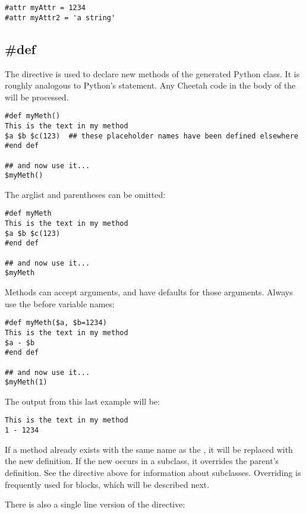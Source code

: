 \begin{verbatim}
#attr myAttr = 1234
#attr myAttr2 = 'a string'
\end{verbatim}


\subsection{\#def}
\label{inheritanceEtc.def}

The  directive is used to declare new methods of the generated Python
class.  It is roughly analogous to Python's  statement.  Any Cheetah
code in the body of the  will be processed.  

\begin{verbatim}
#def myMeth()
This is the text in my method 
$a $b $c(123)  ## these placeholder names have been defined elsewhere
#end def

## and now use it...
$myMeth()
\end{verbatim}

The arglist and parentheses can be omitted:
\begin{verbatim}
#def myMeth
This is the text in my method 
$a $b $c(123)
#end def

## and now use it...
$myMeth
\end{verbatim}

Methods can accept arguments, and have defaults for those arguments.  Always use the 
\code{\$} before variable names:
\begin{verbatim}
#def myMeth($a, $b=1234)
This is the text in my method 
$a - $b
#end def

## and now use it...
$myMeth(1)
\end{verbatim}

The output from this last example will be:

\begin{verbatim}
This is the text in my method 
1 - 1234
\end{verbatim}

If a method already exists with the same name as the , it will be replaced
with the new definition.  If the new  occurs in a subclass, it overrides the
parent's definition.  See the  directive above for information about
subclasses.  Overriding is frequently used for blocks, which will be described next.

There is also a single line version of the  directive:

